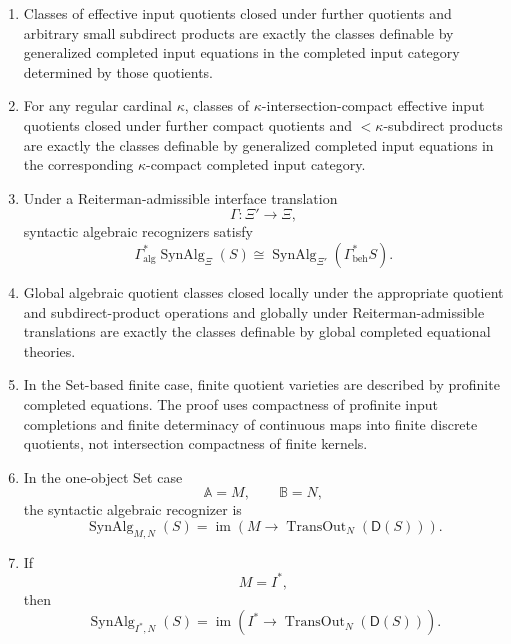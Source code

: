 \begin{theorem}
\begin{enumerate}
\item Classes of effective input quotients closed under further quotients and
arbitrary small subdirect products are exactly the classes definable by
generalized completed input equations in the completed input category
determined by those quotients.

\item For any regular cardinal \(\kappa\), classes of
\(\kappa\)-intersection-compact effective input quotients closed under
further compact quotients and \(<\kappa\)-subdirect products are exactly the
classes definable by generalized completed input equations in the
corresponding \(\kappa\)-compact completed input category.

\item Under a Reiterman-admissible interface translation
\[
\Gamma:\Xi'\to\Xi,
\]
syntactic algebraic recognizers satisfy
\[
\Gamma_{\mathrm{alg}}^\ast
\operatorname{SynAlg}_{\Xi}(S)
\cong
\operatorname{SynAlg}_{\Xi'}(\Gamma_{\mathrm{beh}}^\ast S).
\]

\item Global algebraic quotient classes closed locally under the appropriate
quotient and subdirect-product operations and globally under
Reiterman-admissible translations are exactly the classes definable by global
completed equational theories.

\item In the Set-based finite case, finite quotient varieties are described
by profinite completed equations. The proof uses compactness of profinite
input completions and finite determinacy of continuous maps into finite
discrete quotients, not intersection compactness of finite kernels.

\item In the one-object Set case
\[
\mathbb A=M,
\qquad
\mathbb B=N,
\]
the syntactic algebraic recognizer is
\[
\operatorname{SynAlg}_{M,N}(S)
=
\operatorname{im}
\left(
M\to
\operatorname{TransOut}_N(\mathsf D(S))
\right).
\]

\item If
\[
M=I^\ast,
\]
then
\[
\operatorname{SynAlg}_{I^\ast,N}(S)
=
\operatorname{im}
\left(
I^\ast
\to
\operatorname{TransOut}_N(\mathsf D(S))
\right).
\]
\end{enumerate}
\end{theorem}


